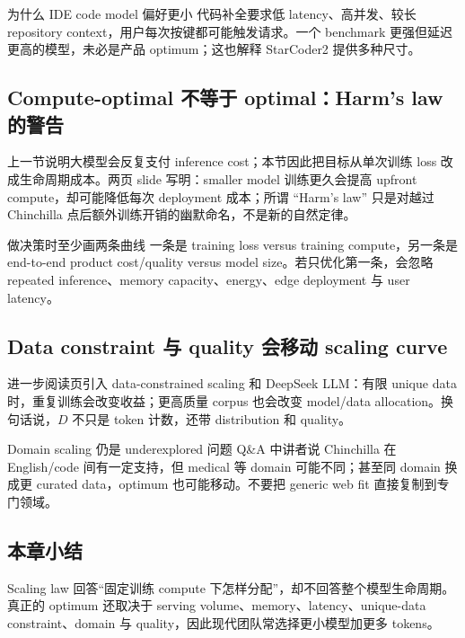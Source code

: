 \begin{knowledgebox}{为什么 IDE code model 偏好更小}
代码补全要求低 latency、高并发、较长 repository context，用户每次按键都可能触发请求。一个 benchmark 更强但延迟更高的模型，未必是产品 optimum；这也解释 StarCoder2 提供多种尺寸。
\end{knowledgebox}

\subsection{Compute-optimal 不等于 optimal：Harm's law 的警告}

上一节说明大模型会反复支付 inference cost；本节因此把目标从单次训练 loss 改成生命周期成本。两页 slide 写明：smaller model 训练更久会提高 upfront compute，却可能降低每次 deployment 成本；所谓 ``Harm's law'' 只是对越过 Chinchilla 点后额外训练开销的幽默命名，不是新的自然定律。



\begin{importantbox}{做决策时至少画两条曲线}
一条是 training loss versus training compute，另一条是 end-to-end product cost/quality versus model size。若只优化第一条，会忽略 repeated inference、memory capacity、energy、edge deployment 与 user latency。
\end{importantbox}

\subsection{Data constraint 与 quality 会移动 scaling curve}

进一步阅读页引入 data-constrained scaling 和 DeepSeek LLM：有限 unique data 时，重复训练会改变收益；更高质量 corpus 也会改变 model/data allocation。换句话说，$D$ 不只是 token 计数，还带 distribution 和 quality。


\begin{warningbox}{Domain scaling 仍是 underexplored 问题}
Q\&A 中讲者说 Chinchilla 在 English/code 间有一定支持，但 medical 等 domain 可能不同；甚至同 domain 换成更 curated data，optimum 也可能移动。不要把 generic web fit 直接复制到专门领域。
\end{warningbox}


\subsection{本章小结}

Scaling law 回答“固定训练 compute 下怎样分配”，却不回答整个模型生命周期。真正的 optimum 还取决于 serving volume、memory、latency、unique-data constraint、domain 与 quality，因此现代团队常选择更小模型加更多 tokens。

